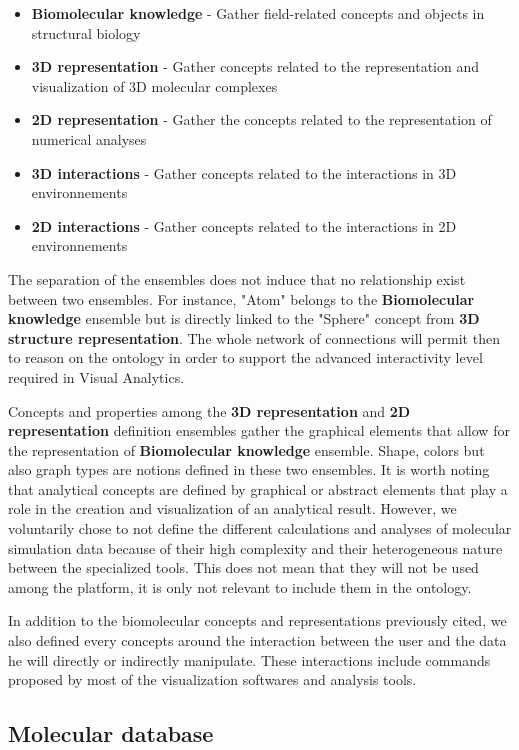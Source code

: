 \documentclass{vgtc}                          %
\begin{document}
\begin{itemize}
  \item \textbf{Biomolecular knowledge} - Gather field-related concepts and objects in structural biology 
  \item \textbf{3D representation} - Gather concepts related to the representation and visualization of 3D molecular complexes
  \item \textbf{2D representation} - Gather the concepts related to the representation of numerical analyses 
  \item \textbf{3D interactions} - Gather concepts related to the interactions in 3D environnements
  \item \textbf{2D interactions} - Gather concepts related to the interactions in 2D environnements
\end{itemize}

The separation of the ensembles does not induce that no relationship exist between two ensembles. For instance, "Atom" belongs to the \textbf{Biomolecular knowledge} ensemble but is directly linked to the "Sphere" concept from \textbf{3D structure representation}. The whole network of connections will permit then to reason on the ontology in order to support the advanced interactivity level required in Visual Analytics.

Concepts and properties among the \textbf{3D representation} and \textbf{2D representation} definition ensembles gather the graphical elements that allow for the representation of \textbf{Biomolecular knowledge} ensemble. Shape, colors but also graph types are notions defined in these two ensembles. It is worth noting that analytical concepts are defined by graphical or abstract elements that play a role in the creation and visualization of an analytical result. However, we voluntarily chose to not define the different calculations and analyses of molecular simulation data because of their high complexity and their heterogeneous nature between the specialized tools. This does not mean that they will not be used among the platform, it is only not relevant to include them in the ontology.

In addition to the biomolecular concepts and representations previously cited, we also defined every concepts around the interaction between the user and the data he will directly or indirectly manipulate. These interactions include commands proposed by most of the visualization softwares and analysis tools.

\subsection{Molecular database}
\end{document}
